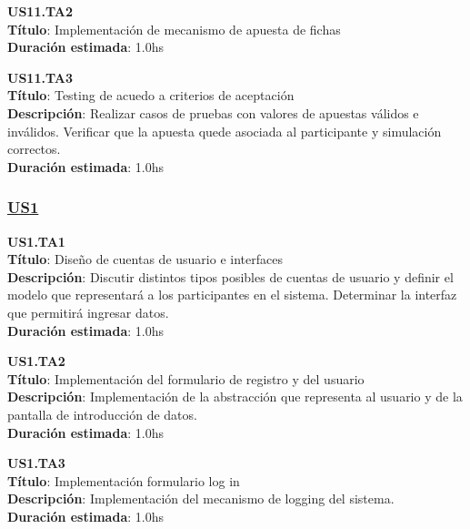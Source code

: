 \begin{tcolorbox}
\textbf{US11.TA2} \\
\textbf{Título}: Implementación de mecanismo de apuesta de fichas \\
\textbf{Duración estimada}: 1.0hs
\end{tcolorbox}
\vspace{10pt}


\begin{tcolorbox}
\textbf{US11.TA3} \\
\textbf{Título}: Testing de acuedo a criterios de aceptación \\
\textbf{Descripción}: Realizar casos de pruebas con valores de apuestas válidos e inválidos. Verificar que la apuesta quede asociada al participante y simulación correctos.\\
\textbf{Duración estimada}: 1.0hs
\end{tcolorbox}
\vspace{10pt}



\subsubsection*{\underline{US1}}

\begin{tcolorbox}
\textbf{US1.TA1} \\
\textbf{Título}: Diseño de cuentas de usuario e interfaces\\
\textbf{Descripción}: Discutir distintos tipos posibles de cuentas de usuario y definir el modelo que representará a los participantes en el sistema. Determinar la interfaz que permitirá ingresar datos.\\
\textbf{Duración estimada}: 1.0hs
\end{tcolorbox}
\vspace{10pt}

\begin{tcolorbox}
\textbf{US1.TA2} \\
\textbf{Título}:  Implementación del formulario de registro y del usuario\\
\textbf{Descripción}: Implementación de la abstracción que representa al usuario y de la pantalla de introducción de datos.\\
\textbf{Duración estimada}: 1.0hs
\end{tcolorbox}
\vspace{10pt}

\begin{tcolorbox}
\textbf{US1.TA3} \\
\textbf{Título}: Implementación formulario log in \\
\textbf{Descripción}: Implementación del mecanismo de logging del sistema.\\
\textbf{Duración estimada}: 1.0hs
\end{tcolorbox}
\vspace{10pt}

